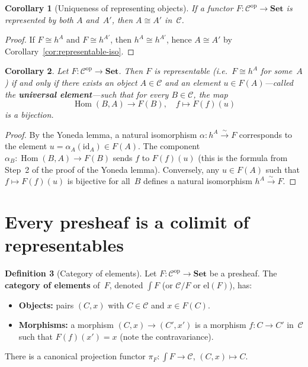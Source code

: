 \documentclass[a4paper,12pt]{book}
\DeclareMathOperator{\Hom}{Hom}
\newcommand{\Set}{\mathbf{Set}}
\newcommand{\op}{\mathrm{op}}
\newcommand{\id}{\mathrm{id}}
\theoremstyle{definition}
\newtheorem{definition}{Definition}[section]
\theoremstyle{plain}
\newtheorem{corollary}[definition]{Corollary}
\theoremstyle{remark}
\begin{document}
\begin{corollary}[Uniqueness of representing objects]%
\label{cor:rep-unique}
If a functor $F\colon\mathcal{C}^{\op}\to\Set$ is represented by both
$A$ and~$A'$, then $A\cong A'$ in~$\mathcal{C}$.
\end{corollary}

\begin{proof}
If $F\cong h^A$ and $F\cong h^{A'}$, then $h^A\cong h^{A'}$, hence
$A\cong A'$ by Corollary~\ref{cor:representable-iso}.
\end{proof}

\begin{corollary}\label{cor:yoneda-universal-element}
Let $F\colon\mathcal{C}^{\op}\to\Set$.  Then $F$ is representable
(i.e.\ $F\cong h^A$ for some~$A$) if and only if there exists an object
$A\in\mathcal{C}$ and an element $u\in F(A)$---called the
\textbf{universal element}---such that for every $B\in\mathcal{C}$, the map
\[
    \Hom(B,A) \longrightarrow F(B), \quad f\longmapsto F(f)(u)
\]
is a bijection.
\end{corollary}

\begin{proof}
By the Yoneda lemma, a natural isomorphism $\alpha\colon h^A\xrightarrow{\sim} F$
corresponds to the element $u = \alpha_A(\id_A)\in F(A)$.
The component $\alpha_B\colon\Hom(B,A)\to F(B)$ sends $f$ to
$F(f)(u)$ (this is the formula from Step~2 of the proof of the
Yoneda lemma).  Conversely, any $u\in F(A)$ such that $f\mapsto F(f)(u)$
is bijective for all~$B$ defines a natural isomorphism
$h^A\xrightarrow{\sim}F$.
\end{proof}


\section{Every presheaf is a colimit of representables}%
\label{sec:colim-representables}

\begin{definition}[Category of elements]\label{def:category-of-elements}
Let $F\colon\mathcal{C}^{\op}\to\Set$ be a presheaf.
The \textbf{category of elements} of~$F$, denoted $\int F$
(or $\mathcal{C}/F$ or $\mathrm{el}(F)$), has:
\begin{itemize}
\item \textbf{Objects:} pairs $(C,x)$ with $C\in\mathcal{C}$ and $x\in F(C)$.
\item \textbf{Morphisms:} a morphism $(C,x)\to(C',x')$ is a morphism
    $f\colon C\to C'$ in~$\mathcal{C}$ such that $F(f)(x') = x$
    (note the contravariance).
\end{itemize}
There is a canonical projection functor
$\pi_F\colon\int F\to\mathcal{C}$, $(C,x)\mapsto C$.
\end{definition}
\end{document}
